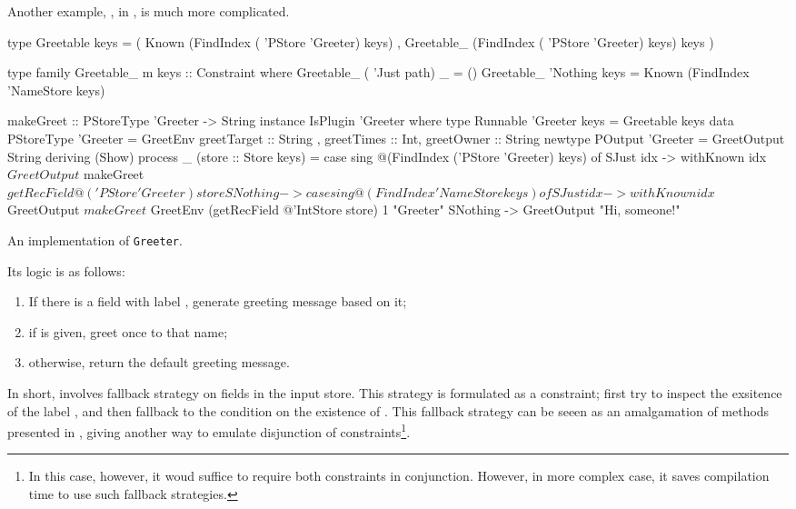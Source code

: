 \documentclass[demotion-paper.tex]{subfiles}
\begin{document}
Another example, , in , is much more complicated.
\begin{listing}[tbp]
\begin{code}
type Greetable keys =
  ( Known (FindIndex ( 'PStore 'Greeter) keys)
  , Greetable_ 
    (FindIndex ( 'PStore 'Greeter) keys) keys
  )

type family Greetable_ m keys :: Constraint where
  Greetable_ ( 'Just path) _ = ()
  Greetable_ 'Nothing keys = 
    Known (FindIndex 'NameStore keys)

makeGreet :: PStoreType 'Greeter -> String
instance IsPlugin 'Greeter where
  type Runnable 'Greeter keys = Greetable keys
  data PStoreType 'Greeter = GreetEnv
    { greetTarget :: String
    , greetTimes :: Int, greetOwner :: String }
  newtype POutput 'Greeter = 
    GreetOutput String deriving (Show)
  process _ (store :: Store keys) =
    case sing
        @(FindIndex ('PStore 'Greeter) keys) of
     SJust idx -> withKnown idx $ GreetOutput $
       makeGreet $ getRecField 
         @('PStore 'Greeter) store
     SNothing ->
      case sing @(FindIndex 'NameStore keys) of
       SJust idx -> withKnown idx $ GreetOutput $
         makeGreet $ GreetEnv
          (getRecField @'IntStore store)
          1 "Greeter"
       SNothing -> GreetOutput "Hi, someone!"
\end{code}
\caption{An implementation of \texttt{Greeter}.}
\label{lst:plugin-greet}
\end{listing}
Its logic is as follows:
\begin{enumerate}
  \item If there is a field with label , generate greeting message based on it;
  \item if  is given, greet once to that name;
  \item otherwise, return the default greeting message.
\end{enumerate}
In short,  involves fallback strategy on fields in the input store.
This strategy is formulated as a  constraint; first try to inspect the exsitence of the label , and then fallback to the condition on the existence of .
This fallback strategy can be seeen as an amalgamation of methods presented in , giving another way to emulate disjunction of constraints\footnote{%
In this case, however, it woud suffice to require both  constraints in conjunction. However, in more complex case, it saves compilation time to use such fallback strategies.}.
\end{document}
